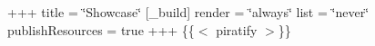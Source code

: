 +++ title = \char`\"{}\+Showcase\char`\"{} \mbox{[}\+\_\+build\mbox{]} render = \char`\"{}always\char`\"{} list = \char`\"{}never\char`\"{} publish\+Resources = true +++ \{\{$<$ piratify $>$\}\} 